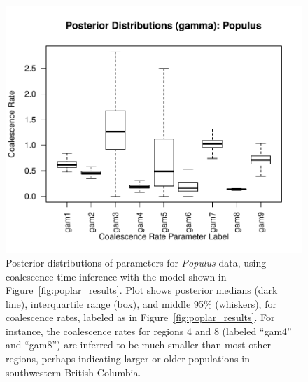 \documentclass{article}
\newif\ifsubmission
\begin{document}
\begin{figure}
\centering
    \includegraphics[width=\textwidth]{poplars/posterior_dists_gam_populus}
    \caption{
        Posterior distributions of parameters for \textit{Populus} data,
        using coalescence time inference with the model shown in Figure~\ref{fig:poplar_results}.
        Plot shows posterior medians (dark line),
        interquartile range (box), and middle 95\% (whiskers),
        for coalescence rates, labeled as in Figure~\ref{fig:poplar_results}.
        For instance, the coalescence rates for regions 4 and 8 (labeled ``gam4'' and ``gam8'')
        are inferred to be much smaller than most other regions, 
        perhaps indicating larger or older populations in southwestern British Columbia.
        \label{sfig:poplar_gam}
    }
\end{figure}

\ifsubmission
\processdelayedfloats
\fi

\newpage

\end{document}
